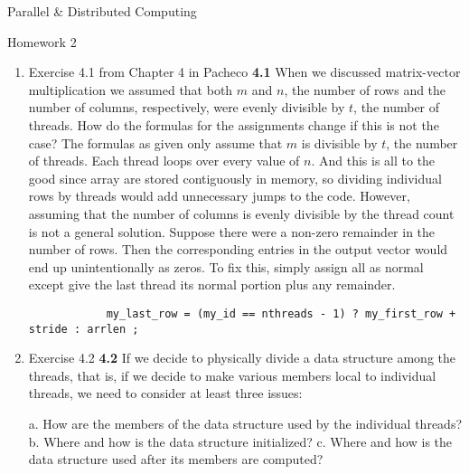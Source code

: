 \message{ !name(hw2.tex)}\documentclass[11pt,epsfig,letterpaper]{article}
\begin{document}



    \vspace{5pc}
    \centerline{\huge Parallel \& Distributed Computing}
    \vspace{0.5pc}
    \centerline{\huge Homework 2}
    \vspace{3pc}


    \begin{enumerate}

            \item Exercise 4.1 from Chapter 4 in Pacheco
            {\bf 4.1} \>\> When we discussed matrix-vector multiplication we assumed that both $m$ and $n$, the number of rows and the number of columns, respectively, were evenly divisible by $t$, the number of threads. How do the formulas for the assignments change if this is not the case?
            \vspace{0.5pc}
            \quad The formulas as given only assume that $m$ is divisible by $t$, the number of threads. Each thread loops over every value of $n$. And this is all to the good since array are stored contiguously in memory, so dividing individual rows by threads would add unnecessary jumps to the code.
            \quad However, assuming that the number of columns is evenly divisible by the thread count is not a general solution. Suppose there were a non-zero remainder in the number of rows. Then the corresponding entries in the output vector would end up unintentionally as zeros.
            \quad To fix this, simply assign all as normal except give the last thread its normal portion plus any remainder.
            \begin{verbatim}
            my_last_row = (my_id == nthreads - 1) ? my_first_row + stride : arrlen ;
            \end{verbatim}


            \item Exercise 4.2
            {\bf 4.2}\>\> If we decide to physically divide a data structure among the threads, that is, if we decide to make various members local to individual threads, we need to consider at least three issues:
            \begin{enumerate}
            a. How are the members of the data structure used by the individual threads?
            b. Where and how is the data structure initialized?
            c. Where and how is the data structure used after its members are computed?
            \end{enumerate}


\end{enumerate}
\end{document}
